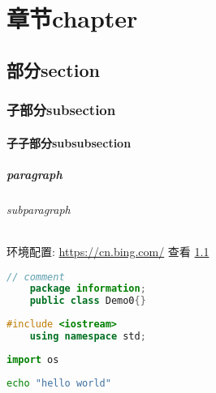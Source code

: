 \chapter{章节chapter}

\section{部分section}\label{1}
\subsection{子部分subsection}
\subsubsection{子子部分subsubsection}
\paragraph{
    paragraph
}
\subparagraph{
    subparagraph
}

\newpage

环境配置: \url{https://cn.bing.com/}
查看 \ref{1}

\begin{lstlisting}[language=java]
    // comment
    package information;
    public class Demo0{}
\end{lstlisting}

\begin{lstlisting}[language=c++]
    #include <iostream>
    using namespace std;
\end{lstlisting}

\begin{lstlisting}[language=python]
    import os
\end{lstlisting}

\begin{lstlisting}[language=bash]
    echo "hello world"
\end{lstlisting}